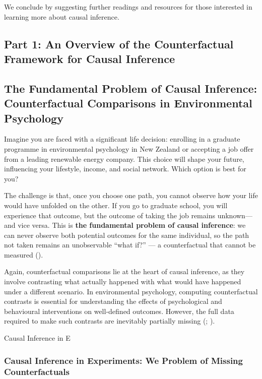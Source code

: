 \documentclass[
  singlecolumn]{article}
\begin{document}
We conclude by suggesting further readings and resources for those
interested in learning more about causal inference.

\subsection{Part 1: An Overview of the Counterfactual Framework for
Causal Inference}\label{section-part1}

\subsection{The Fundamental Problem of Causal Inference: Counterfactual
Comparisons in Environmental
Psychology}\label{the-fundamental-problem-of-causal-inference-counterfactual-comparisons-in-environmental-psychology}

Imagine you are faced with a significant life decision: enrolling in a
graduate programme in environmental psychology in New Zealand or
accepting a job offer from a leading renewable energy company. This
choice will shape your future, influencing your lifestyle, income, and
social network. Which option is best for you?

The challenge is that, once you choose one path, you cannot observe how
your life would have unfolded on the other. If you go to graduate
school, you will experience that outcome, but the outcome of taking the
job remains unknown---and vice versa. This is \textbf{the fundamental
problem of causal inference}: we can never observe both potential
outcomes for the same individual, so the path not taken remains an
unobservable ``what if?'' --- a counterfactual that cannot be measured
().

Again, counterfactual comparisons lie at the heart of causal inference,
as they involve contrasting what actually happened with what would have
happened under a different scenario. In environmental psychology,
computing counterfactual contrasts is essential for understanding the
effects of psychological and behavioural interventions on well-defined
outcomes. However, the full data required to make such contrasts are
inevitably partially missing (; ).

Causal Inference in E

\subsubsection{Causal Inference in Experiments: We Problem of Missing
Counterfactuals}\label{causal-inference-in-experiments-we-problem-of-missing-counterfactuals}
\end{document}
